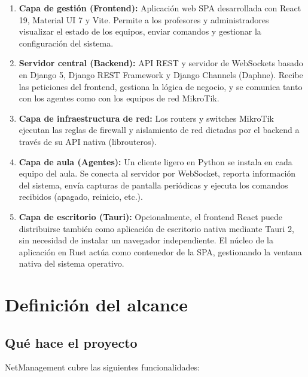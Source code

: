 \documentclass[12pt, a4paper, twoside]{article}
\begin{document}
\begin{enumerate}
  \item \textbf{Capa de gestión (Frontend):} Aplicación web SPA desarrollada con React 19, Material UI 7 y Vite. Permite a los profesores y administradores visualizar el estado de los equipos, enviar comandos y gestionar la configuración del sistema.

  \item \textbf{Servidor central (Backend):} API REST y servidor de WebSockets basado en Django 5, Django REST Framework y Django Channels (Daphne). Recibe las peticiones del frontend, gestiona la lógica de negocio, y se comunica tanto con los agentes como con los equipos de red MikroTik.

  \item \textbf{Capa de infraestructura de red:} Los routers y switches MikroTik ejecutan las reglas de firewall y aislamiento de red dictadas por el backend a través de su API nativa (librouteros).

  \item \textbf{Capa de aula (Agentes):} Un cliente ligero en Python se instala en cada equipo del aula. Se conecta al servidor por WebSocket, reporta información del sistema, envía capturas de pantalla periódicas y ejecuta los comandos recibidos (apagado, reinicio, etc.).
  \item \textbf{Capa de escritorio (Tauri):} Opcionalmente, el frontend React puede distribuirse también como aplicación de escritorio nativa mediante Tauri 2, sin necesidad de instalar un navegador independiente. El núcleo de la aplicación en Rust actúa como contenedor de la SPA, gestionando la ventana nativa del sistema operativo.
\end{enumerate}

\section{Definición del alcance}

\subsection{Qué hace el proyecto}

NetManagement cubre las siguientes funcionalidades:
\end{document}
